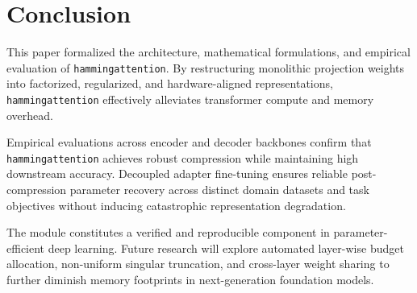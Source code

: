 \section{Conclusion}
This paper formalized the architecture, mathematical formulations, and empirical evaluation of \texttt{hammingattention}. By restructuring monolithic projection weights into factorized, regularized, and hardware-aligned representations, \texttt{hammingattention} effectively alleviates transformer compute and memory overhead.

Empirical evaluations across encoder and decoder backbones confirm that \texttt{hammingattention} achieves robust compression while maintaining high downstream accuracy. Decoupled adapter fine-tuning ensures reliable post-compression parameter recovery across distinct domain datasets and task objectives without inducing catastrophic representation degradation.

The module constitutes a verified and reproducible component in parameter-efficient deep learning. Future research will explore automated layer-wise budget allocation, non-uniform singular truncation, and cross-layer weight sharing to further diminish memory footprints in next-generation foundation models.
